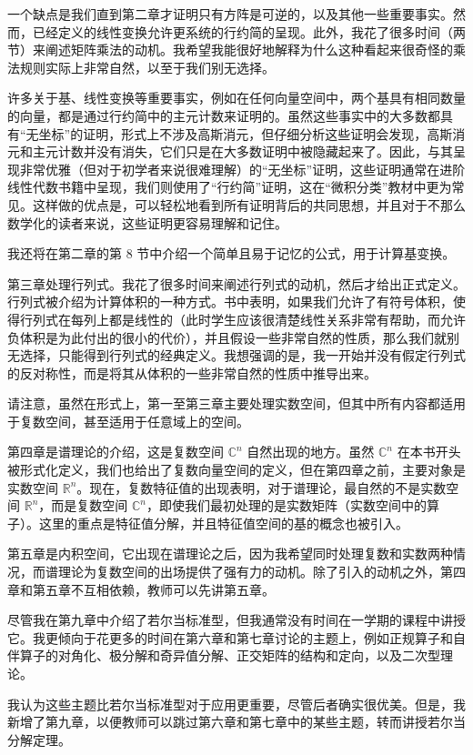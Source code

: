 \begin{preface}
一个缺点是我们直到第二章才证明只有方阵是可逆的，以及其他一些重要事实。然而，已经定义的线性变换允许更系统的行约简的呈现。此外，我花了很多时间（两节）来阐述矩阵乘法的动机。我希望我能很好地解释为什么这种看起来很奇怪的乘法规则实际上非常自然，以至于我们别无选择。

许多关于基、线性变换等重要事实，例如在任何向量空间中，两个基具有相同数量的向量，都是通过行约简中的主元计数来证明的。虽然这些事实中的大多数都具有“无坐标”的证明，形式上不涉及高斯消元，但仔细分析这些证明会发现，高斯消元和主元计数并没有消失，它们只是在大多数证明中被隐藏起来了。因此，与其呈现非常优雅（但对于初学者来说很难理解）的“无坐标”证明，这些证明通常在进阶线性代数书籍中呈现，我们则使用了“行约简”证明，这在“微积分类”教材中更为常见。这样做的优点是，可以轻松地看到所有证明背后的共同思想，并且对于不那么数学化的读者来说，这些证明更容易理解和记住。

我还将在第二章的第 8 节中介绍一个简单且易于记忆的公式，用于计算基变换。

第三章处理行列式。我花了很多时间来阐述行列式的动机，然后才给出正式定义。行列式被介绍为计算体积的一种方式。书中表明，如果我们允许了有符号体积，使得行列式在每列上都是线性的（此时学生应该很清楚线性关系非常有帮助，而允许负体积是为此付出的很小的代价），并且假设一些非常自然的性质，那么我们就别无选择，只能得到行列式的经典定义。我想强调的是，我一开始并没有假定行列式的反对称性，而是将其从体积的一些非常自然的性质中推导出来。

请注意，虽然在形式上，第一至第三章主要处理实数空间，但其中所有内容都适用于复数空间，甚至适用于任意域上的空间。

第四章是谱理论的介绍，这是复数空间 $\mathbb{C}^n$ 自然出现的地方。虽然 $\mathbb{C}^n$ 在本书开头被形式化定义，我们也给出了复数向量空间的定义，但在第四章之前，主要对象是实数空间 $\mathbb{R}^n$。现在，复数特征值的出现表明，对于谱理论，最自然的不是实数空间 $\mathbb{R}^n$，而是复数空间 $\mathbb{C}^n$，即使我们最初处理的是实数矩阵（实数空间中的算子）。这里的重点是特征值分解，并且特征值空间的基的概念也被引入。

第五章是内积空间，它出现在谱理论之后，因为我希望同时处理复数和实数两种情况，而谱理论为复数空间的出场提供了强有力的动机。除了引入的动机之外，第四章和第五章不互相依赖，教师可以先讲第五章。

尽管我在第九章中介绍了若尔当标准型，但我通常没有时间在一学期的课程中讲授它。我更倾向于花更多的时间在第六章和第七章讨论的主题上，例如正规算子和自伴算子的对角化、极分解和奇异值分解、正交矩阵的结构和定向，以及二次型理论。

我认为这些主题比若尔当标准型对于应用更重要，尽管后者确实很优美。但是，我新增了第九章，以便教师可以跳过第六章和第七章中的某些主题，转而讲授若尔当分解定理。


\end{preface}
